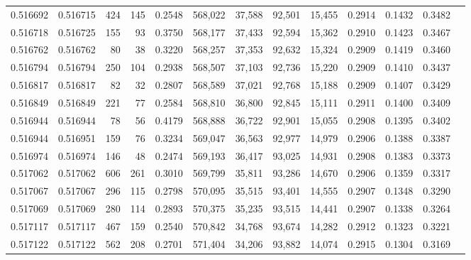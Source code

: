 \begin{tabular}{rrrrrrrrrrrrr}
0.516692 & 0.516715 &   424 &   145 &                                     0.2548 & 568,022 &  37,588 &  92,501 &  15,455 & 0.2914 & 0.1432 & 0.3482 \\
0.516718 & 0.516725 &   155 &    93 &                                     0.3750 & 568,177 &  37,433 &  92,594 &  15,362 & 0.2910 & 0.1423 & 0.3467 \\
0.516762 & 0.516762 &    80 &    38 &                                     0.3220 & 568,257 &  37,353 &  92,632 &  15,324 & 0.2909 & 0.1419 & 0.3460 \\
0.516794 & 0.516794 &   250 &   104 &                                     0.2938 & 568,507 &  37,103 &  92,736 &  15,220 & 0.2909 & 0.1410 & 0.3437 \\
0.516817 & 0.516817 &    82 &    32 &                                     0.2807 & 568,589 &  37,021 &  92,768 &  15,188 & 0.2909 & 0.1407 & 0.3429 \\
0.516849 & 0.516849 &   221 &    77 &                                     0.2584 & 568,810 &  36,800 &  92,845 &  15,111 & 0.2911 & 0.1400 & 0.3409 \\
0.516944 & 0.516944 &    78 &    56 &                                     0.4179 & 568,888 &  36,722 &  92,901 &  15,055 & 0.2908 & 0.1395 & 0.3402 \\
0.516944 & 0.516951 &   159 &    76 &                                     0.3234 & 569,047 &  36,563 &  92,977 &  14,979 & 0.2906 & 0.1388 & 0.3387 \\
0.516974 & 0.516974 &   146 &    48 &                                     0.2474 & 569,193 &  36,417 &  93,025 &  14,931 & 0.2908 & 0.1383 & 0.3373 \\
0.517062 & 0.517062 &   606 &   261 &                                     0.3010 & 569,799 &  35,811 &  93,286 &  14,670 & 0.2906 & 0.1359 & 0.3317 \\
0.517067 & 0.517067 &   296 &   115 &                                     0.2798 & 570,095 &  35,515 &  93,401 &  14,555 & 0.2907 & 0.1348 & 0.3290 \\
0.517069 & 0.517069 &   280 &   114 &                                     0.2893 & 570,375 &  35,235 &  93,515 &  14,441 & 0.2907 & 0.1338 & 0.3264 \\
0.517117 & 0.517117 &   467 &   159 &                                     0.2540 & 570,842 &  34,768 &  93,674 &  14,282 & 0.2912 & 0.1323 & 0.3221 \\
0.517122 & 0.517122 &   562 &   208 &                                     0.2701 & 571,404 &  34,206 &  93,882 &  14,074 & 0.2915 & 0.1304 & 0.3169 \\

\end{tabular}
